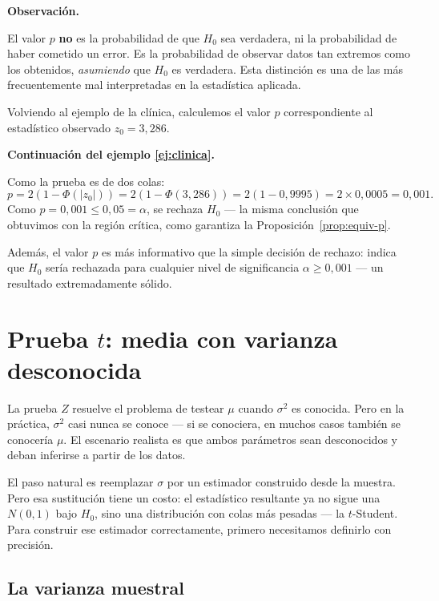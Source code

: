 \documentclass[12pt, a4paper]{book}
\newenvironment{observacion}{%
    \par\medskip\noindent\textbf{\color{azul}Observaci\'{o}n.}\enspace\itshape
}{\par\medskip}
\numberwithin{equation}{chapter}
\begin{document}
\begin{observacion}
	El valor $p$ \textbf{no} es la probabilidad
	de que $H_0$ sea verdadera, ni la probabilidad
	de haber cometido un error. Es la probabilidad
	de observar datos tan extremos como los
	obtenidos, \emph{asumiendo} que $H_0$ es
	verdadera. Esta distinci\'{o}n es una de las
	m\'{a}s frecuentemente mal interpretadas en
	la estad\'{i}stica aplicada.
\end{observacion}

Volviendo al ejemplo de la cl\'{i}nica, calculemos
el valor $p$ correspondiente al estad\'{i}stico
observado $z_0 = 3{,}286$.

\medskip
\textbf{Continuaci\'{o}n del ejemplo
	\ref{ej:clinica}.}

Como la prueba es de dos colas:
\[
p = 2(1 - \Phi(|z_0|))
= 2(1 - \Phi(3{,}286))
= 2(1 - 0{,}9995)
= 2 \times 0{,}0005
= 0{,}001.
\]
Como $p = 0{,}001 \leq 0{,}05 = \alpha$, se
rechaza $H_0$ --- la misma conclusi\'{o}n que
obtuvimos con la regi\'{o}n cr\'{i}tica, como
garantiza la Proposici\'{o}n~\ref{prop:equiv-p}.

Adem\'{a}s, el valor $p$ es m\'{a}s informativo
que la simple decisi\'{o}n de rechazo: indica
que $H_0$ ser\'{i}a rechazada para cualquier
nivel de significancia $\alpha \geq 0{,}001$
--- un resultado extremadamente s\'{o}lido.

\section{Prueba $t$: media con varianza desconocida}

La prueba $Z$ resuelve el problema de testear
$\mu$ cuando $\sigma^2$ es conocida. Pero en la
pr\'{a}ctica, $\sigma^2$ casi nunca se conoce
--- si se conociera, en muchos casos tambi\'{e}n
se conocer\'{i}a $\mu$. El escenario realista es
que ambos par\'{a}metros sean desconocidos y
deban inferirse a partir de los datos.

El paso natural es reemplazar $\sigma$ por un
estimador construido desde la muestra. Pero esa
sustituci\'{o}n tiene un costo: el estad\'{i}stico
resultante ya no sigue una $N(0,1)$ bajo $H_0$,
sino una distribuci\'{o}n con colas m\'{a}s
pesadas --- la $t$-Student. Para construir ese
estimador correctamente, primero necesitamos
definirlo con precisi\'{o}n.

\subsection{La varianza muestral}
\end{document}
